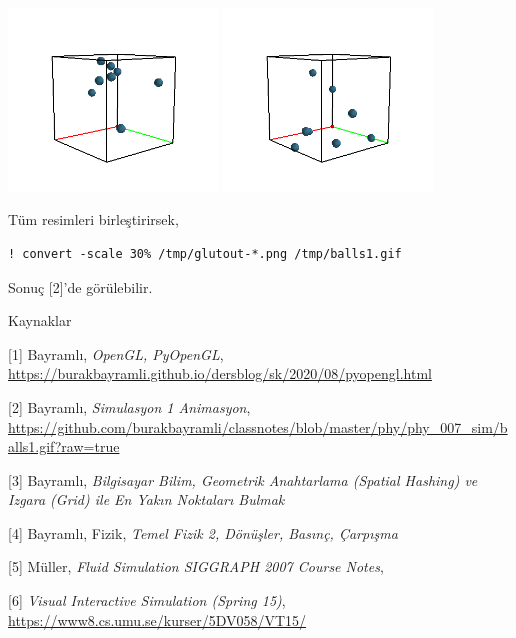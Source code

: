 \documentclass[12pt,fleqn]{article}\usepackage{../../common}
\begin{document}
\includegraphics[width=15em]{glutout-140.png}
\includegraphics[width=15em]{glutout-390.png}

Tüm resimleri birleştirirsek,

\begin{verbatim}
! convert -scale 30% /tmp/glutout-*.png /tmp/balls1.gif
\end{verbatim}

Sonuç [2]'de görülebilir.


Kaynaklar

[1] Bayramlı, {\em OpenGL, PyOpenGL}, \url{https://burakbayramli.github.io/dersblog/sk/2020/08/pyopengl.html}

[2] Bayramlı, {\em Simulasyon 1 Animasyon},
    \url{https://github.com/burakbayramli/classnotes/blob/master/phy/phy_007_sim/balls1.gif?raw=true}

[3] Bayramlı, {\em Bilgisayar Bilim, Geometrik Anahtarlama (Spatial Hashing) ve Izgara (Grid) ile En Yakın Noktaları Bulmak}

[4] Bayramlı, Fizik, {\em Temel Fizik 2, Dönüşler, Basınç, Çarpışma}

[5] Müller, {\em Fluid Simulation SIGGRAPH 2007 Course Notes},

[6] {\em Visual Interactive Simulation (Spring 15)},
    \url{https://www8.cs.umu.se/kurser/5DV058/VT15/}
\end{document}
